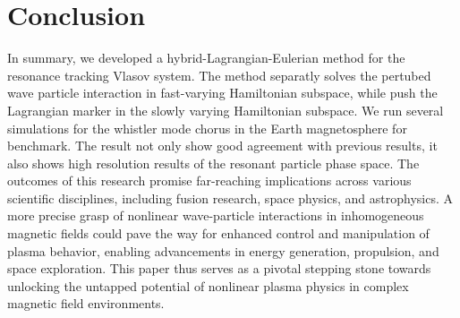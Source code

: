 \section{Conclusion}
\label{sec:end}
In summary, we developed a hybrid-Lagrangian-Eulerian method for the resonance tracking Vlasov system. The method separatly solves the pertubed wave particle interaction in fast-varying Hamiltonian subspace, while push the Lagrangian marker in the slowly varying Hamiltonian subspace. 
We run several simulations for the whistler mode chorus in the Earth magnetosphere for benchmark. The result not only show good agreement with previous results, it also shows high resolution results of the resonant particle phase space.
The outcomes of this research promise far-reaching implications across various scientific disciplines, including fusion research, space physics, and astrophysics. A more precise grasp of nonlinear wave-particle interactions in inhomogeneous magnetic fields could pave the way for enhanced control and manipulation of plasma behavior, enabling advancements in energy generation, propulsion, and space exploration. This paper thus serves as a pivotal stepping stone towards unlocking the untapped potential of nonlinear plasma physics in complex magnetic field environments.